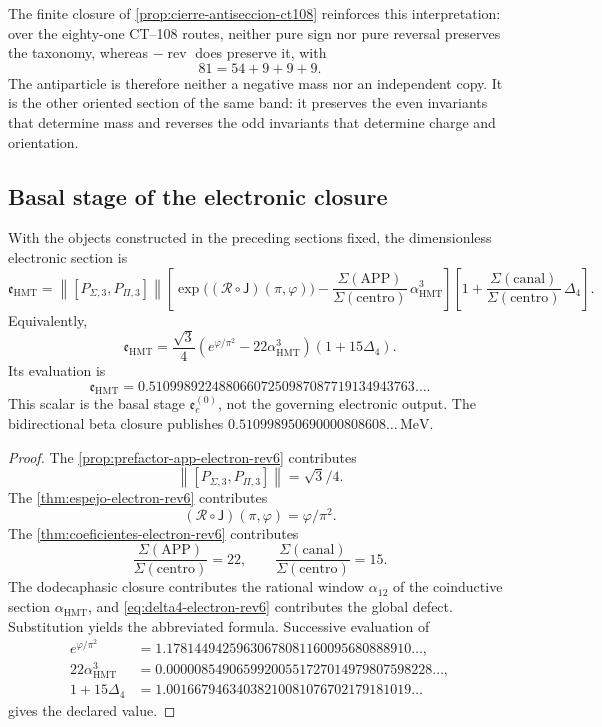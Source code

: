 The finite closure of \cref{prop:cierre-antiseccion-ct108} reinforces this
interpretation: over the eighty-one CT--108 routes, neither pure sign nor
pure reversal preserves the taxonomy, whereas
\(-\operatorname{rev}\) does preserve it, with
\[
 81=54+9+9+9.
\]
The antiparticle is therefore neither a negative mass nor an independent
copy. It is the other oriented section of the same band: it preserves the
even invariants that determine mass and reverses the odd invariants that
determine charge and orientation.

\subsection{Basal stage of the electronic closure}

\begin{theorem}
\label{thm:cierre-electron-holografico-rev6}
With the objects constructed in the preceding sections fixed, the
dimensionless electronic section is
\[
 \mathfrak e_{\mathrm{HMT}}
 =
 \left\|[P_{\Sigma,3},P_{\Pi,3}]\right\|
 \left[
 \exp\bigl((\mathscr R\circ\mathsf J)(\pi,\varphi)\bigr)
 -\frac{\Sigma(\mathrm{APP})}
 {\Sigma(\mathrm{centro})}\,
 \alpha_{\mathrm{HMT}}^3
 \right]
 \left[
 1+
 \frac{\Sigma(\mathrm{canal})}
 {\Sigma(\mathrm{centro})}\,
 \Delta_4
 \right].
\]
Equivalently,
\[
 \boxed{
 \mathfrak e_{\mathrm{HMT}}
 =
 \frac{\sqrt3}{4}
 \left(e^{\varphi/\pi^2}
 -22\alpha_{\mathrm{HMT}}^3\right)
 (1+15\Delta_4).}
\]
Its evaluation is
\[
 \boxed{
 \mathfrak e_{\mathrm{HMT}}
 =
 0.51099892248806607250987087719134943763\ldots.}
\]
This scalar is the basal stage \(\mathfrak e_e^{(0)}\), not the governing
electronic output. The bidirectional beta closure publishes
\(0.510998950690000808608\ldots\,\mathrm{MeV}\).
\end{theorem}

\begin{proof}
The \cref{prop:prefactor-app-electron-rev6} contributes
\[
 \left\|[P_{\Sigma,3},P_{\Pi,3}]\right\|=\sqrt3/4.
\]
The \cref{thm:espejo-electron-rev6} contributes
\[
 (\mathscr R\circ\mathsf J)(\pi,\varphi)=\varphi/\pi^2.
\]
The \cref{thm:coeficientes-electron-rev6} contributes
\[
 \frac{\Sigma(\mathrm{APP})}{\Sigma(\mathrm{centro})}=22,
 \qquad
 \frac{\Sigma(\mathrm{canal})}{\Sigma(\mathrm{centro})}=15.
\]
The dodecaphasic closure contributes the rational window \(\alpha_{12}\) of the
coinductive section \(\alpha_{\mathrm{HMT}}\), and
\cref{eq:delta4-electron-rev6} contributes the global defect. Substitution
yields the abbreviated formula. Successive evaluation of
\[
\begin{aligned}
 e^{\varphi/\pi^2}
 &=1.17814494259630678081160095680888910\ldots,\\
 22\alpha_{\mathrm{HMT}}^3
 &=0.00000854906599200551727014979807598228\ldots,\\
 1+15\Delta_4
 &=1.00166794634038210081076702179181019\ldots
\end{aligned}
\]
gives the declared value.
\end{proof}

